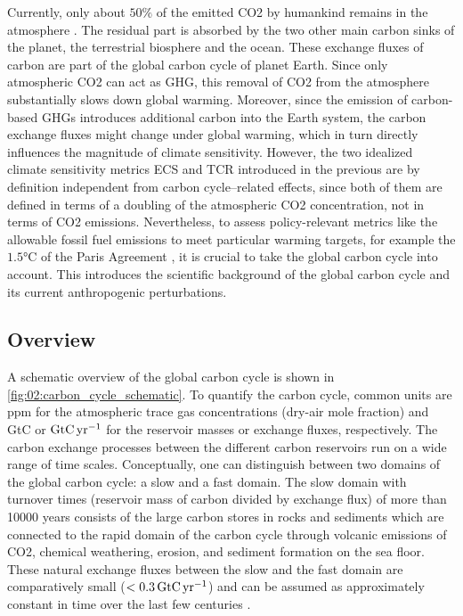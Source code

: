 Currently, only about $50 \unit{\%}$ of the emitted \ac{CO2} by humankind
remains in the atmosphere \autocite{Friedlingstein2020}. The residual part is
absorbed by the two other main carbon sinks of the planet, the terrestrial
biosphere and the ocean. These exchange fluxes of carbon are part of the global
carbon cycle of planet Earth. Since only atmospheric \ac{CO2} can act as
\ac{GHG}, this removal of \ac{CO2} from the atmosphere substantially slows down
global warming. Moreover, since the emission of carbon-based \acp{GHG}
introduces additional carbon into the Earth system, the carbon exchange fluxes
might change under global warming, which in turn directly influences the
magnitude of climate sensitivity. However, the two idealized climate
sensitivity metrics \ac{ECS} and \ac{TCR} introduced in the previous
 are by definition independent from carbon
cycle--related effects, since both of them are defined in terms of a doubling
of the atmospheric \ac{CO2} concentration, not in terms of \ac{CO2} emissions.
Nevertheless, to assess policy-relevant metrics like the allowable fossil fuel
emissions to meet particular warming targets, for example the $1.5
\unit{\degreeCelsius}$ of the Paris Agreement \autocite{UNFCCC2015}, it is
crucial to take the global carbon cycle into account. This
 introduces the scientific background of the
global carbon cycle and its current anthropogenic perturbations.


\subsection{Overview}
\label{subsec:02:carbon_cycle_overview}

A schematic overview of the global carbon cycle is shown in
\cref{fig:02:carbon_cycle_schematic}. To quantify the carbon cycle, common
units are \ac{ppm} for the atmospheric trace gas concentrations (dry-air mole
fraction) and \ac{GtC} or $\si{\GtCyr{}}$ for the reservoir masses or exchange
fluxes, respectively. The carbon exchange processes between the different
carbon reservoirs run on a wide range of time scales. Conceptually, one can
distinguish between two domains of the global carbon cycle: a slow and a fast
domain. The slow domain with turnover times (reservoir mass of carbon divided
by exchange flux) of more than 10000 years consists of the large carbon stores
in rocks and sediments which are connected to the rapid domain of the carbon
cycle through volcanic emissions of \ac{CO2}, chemical weathering, erosion, and
sediment formation on the sea floor. These natural exchange fluxes between the
slow and the fast domain are comparatively small ($< 0.3 \unit{\GtCyr{}}$) and
can be assumed as approximately constant in time over the last few centuries
\autocite{Ciais2013}.

